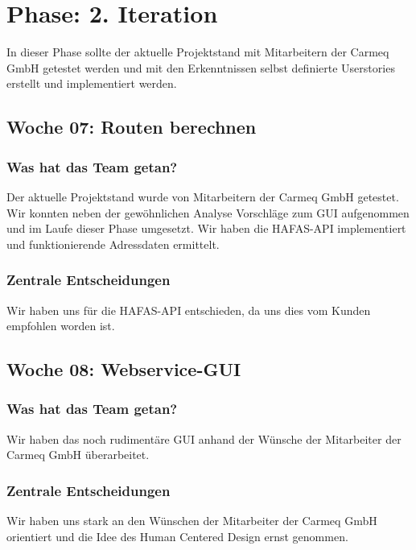 \documentclass[12pt,a4paper]{article}
\begin{document}
\newpage

\section{Phase: 2. Iteration}

In dieser Phase sollte der aktuelle Projektstand mit Mitarbeitern der Carmeq GmbH getestet werden und mit den Erkenntnissen selbst definierte Userstories erstellt und implementiert werden.

\subsection{Woche 07: Routen berechnen}

\subsubsection{Was hat das Team getan?}

Der aktuelle Projektstand wurde von Mitarbeitern der Carmeq GmbH getestet. Wir konnten neben der gew\"ohnlichen Analyse Vorschl\"age zum GUI aufgenommen und im Laufe dieser Phase umgesetzt. Wir haben die HAFAS-API implementiert und funktionierende Adressdaten ermittelt.

\subsubsection{Zentrale Entscheidungen}

Wir haben uns f\"ur die HAFAS-API entschieden, da uns dies vom Kunden empfohlen worden ist.

\subsection{Woche 08: Webservice-GUI}

\subsubsection{Was hat das Team getan?}

Wir haben das noch rudiment\"are GUI anhand der W\"unsche der Mitarbeiter der Carmeq GmbH \"uberarbeitet.

\subsubsection{Zentrale Entscheidungen}

Wir haben uns stark an den W\"unschen der Mitarbeiter der Carmeq GmbH orientiert und die Idee des Human Centered Design ernst genommen.
\end{document}
